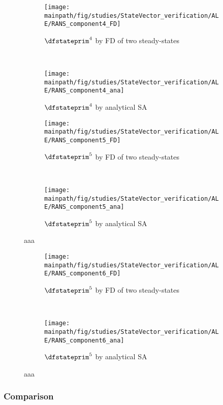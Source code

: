 \documentclass[../main.tex]{subfiles}
\begin{document}
\begin{figure}[t!]
   
    \begin{subfigure}[t]{0.5\textwidth}
        \centering
        \texttt{[image: \\mainpath/fig/studies/StateVector\_verification/ALE/RANS\_component4\_FD]}
        \caption{$\dfstateprim^4$ by \ac{FD} of two steady-states}
    \end{subfigure}%
    ~ 
    \begin{subfigure}[t]{0.5\textwidth}
        \centering
        \texttt{[image: \\mainpath/fig/studies/StateVector\_verification/ALE/RANS\_component4\_ana]}
        \caption{$\dfstateprim^4$ by analytical \ac{SA}}
    \end{subfigure}
    
    
    \begin{subfigure}[t]{0.5\textwidth}
        \centering
        \texttt{[image: \\mainpath/fig/studies/StateVector\_verification/ALE/RANS\_component5\_FD]}
        \caption{$\dfstateprim^5$ by \ac{FD} of two steady-states}
    \end{subfigure}%
    ~ 
    \begin{subfigure}[t]{0.5\textwidth}
        \centering
        \texttt{[image: \\mainpath/fig/studies/StateVector\_verification/ALE/RANS\_component5\_ana]}
        \caption{$\dfstateprim^5$ by analytical \ac{SA}}
    \end{subfigure}
    \caption[aaa]{aaa}
    \label{fig:aaa}
    
    
    \begin{subfigure}[t]{0.5\textwidth}
        \centering
        \texttt{[image: \\mainpath/fig/studies/StateVector\_verification/ALE/RANS\_component6\_FD]}
        \caption{$\dfstateprim^5$ by \ac{FD} of two steady-states}
    \end{subfigure}%
    ~ 
    \begin{subfigure}[t]{0.5\textwidth}
        \centering
        \texttt{[image: \\mainpath/fig/studies/StateVector\_verification/ALE/RANS\_component6\_ana]}
        \caption{$\dfstateprim^5$ by analytical \ac{SA}}
    \end{subfigure}
    \caption[aaa]{aaa}
    \label{fig:aaa}
    
\end{figure}




\subsubsection{Comparison}
\end{document}

